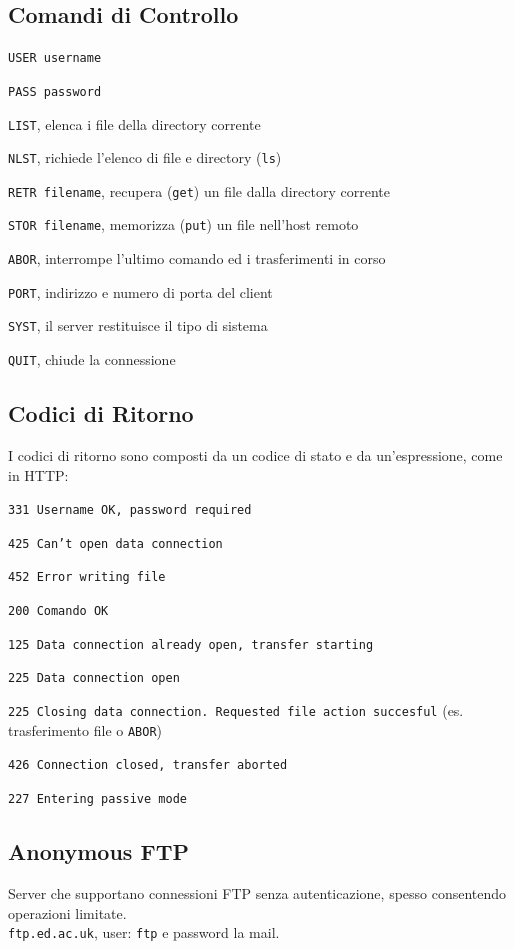 \documentclass[10pt]{article}
\begin{document}
\subsection*{Comandi di Controllo}
\begin{list}{}{}
\item \texttt{USER username}
\item \texttt{PASS password}
\item \texttt{LIST}, elenca i file della directory corrente
\item \texttt{NLST}, richiede l'elenco di file e directory (\texttt{ls})
\item \texttt{RETR filename}, recupera (\texttt{get}) un file dalla directory corrente
\item \texttt{STOR filename}, memorizza (\texttt{put}) un file nell'host remoto
\item \texttt{ABOR}, interrompe l'ultimo comando ed i trasferimenti in corso
\item \texttt{PORT}, indirizzo e numero di porta del client
\item \texttt{SYST}, il server restituisce il tipo di sistema
\item \texttt{QUIT}, chiude la connessione
\end{list}
\subsection*{Codici di Ritorno}
I codici di ritorno sono composti da un codice di stato e da un'espressione, come in HTTP:
\begin{list}{}{}
\item \texttt{331 Username OK, password required}
\item \texttt{425 Can't open data connection}
\item \texttt{452 Error writing file}
\item \texttt{200 Comando OK}
\item \texttt{125 Data connection already open, transfer starting}
\item \texttt{225 Data connection open}
\item \texttt{225 Closing data connection. Requested file action succesful} (es. trasferimento file o \texttt{ABOR})
\item \texttt{426 Connection closed, transfer aborted}
\item \texttt{227 Entering passive mode}
\end{list}
\subsection{Anonymous FTP} Server che supportano connessioni FTP senza autenticazione, spesso consentendo operazioni limitate.\\
\texttt{ftp.ed.ac.uk}, user: \texttt{ftp} e password la mail.
\pagebreak
\end{document}

